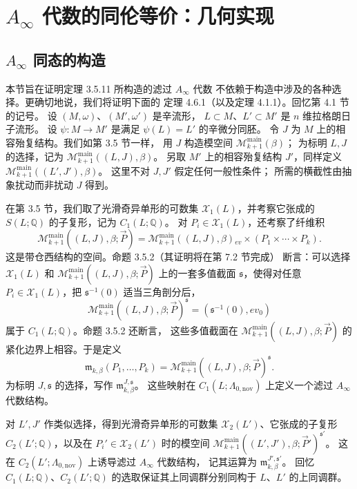 
\section{$A_\infty$ 代数的同伦等价：几何实现}
\label{sec:4-6}

\subsection{$A_\infty$ 同态的构造}
\label{subsec:4-6-1}

本节旨在证明定理 3.5.11 所构造的滤过 $A_\infty$ 代数
不依赖于构造中涉及的各种选择。更确切地说，我们将证明下面的
定理 4.6.1（以及定理 4.1.1）。回忆第 4.1 节的记号。
设 $(M,\omega)$、$(M',\omega')$ 是辛流形，
$L\subset M$、$L'\subset M'$ 是 $n$ 维拉格朗日子流形。
设 $\psi\colon M\to M'$ 是满足 $\psi(L)=L'$ 的辛微分同胚。
令 $J$ 为 $M$ 上的相容殆复结构。我们如第 3.5 节一样，
用 $J$ 构造模空间 $\mathcal M_{k+1}^{\mathrm{main}}(\beta)$；
为标明 $L,J$ 的选择，记为
$\mathcal M_{k+1}^{\mathrm{main}}((L,J),\beta)$。
另取 $M'$ 上的相容殆复结构 $J'$，同样定义
$\mathcal M_{k+1}^{\mathrm{main}}((L',J'),\beta)$。
这里不对 $J,J'$ 假定任何一般性条件；
所需的横截性由抽象扰动而非扰动 $J$ 得到。

在第 3.5 节，我们取了光滑奇异单形的可数集
$\mathcal X_1(L)$，并考察它张成的 $S(L;\mathbb Q)$
的子复形，记为 $C_1(L;\mathbb Q)$。
对 $P_i\in\mathcal X_1(L)$，还考察了纤维积
\[
 \mathcal M_{k+1}^{\mathrm{main}}((L,J),\beta;\vec P)
 =
 \mathcal M_{k+1}^{\mathrm{main}}((L,J),\beta)
 {}_{ev}\!\times(P_1\times\cdots\times P_k).
\]
这是带仓西结构的空间。命题 3.5.2（其证明将在第 7.2 节完成）
断言：可以选择 $\mathcal X_1(L)$ 和
$\mathcal M_{k+1}^{\mathrm{main}}((L,J),\beta;\vec P)$
上的一套多值截面 $\mathfrak s$，使得对任意
$P_i\in\mathcal X_1(L)$，把
$\mathfrak s^{-1}(0)$ 适当三角剖分后，
\[
 \mathcal M_{k+1}^{\mathrm{main}}
 ((L,J),\beta;\vec P)^{\mathfrak s}
 =
 (\mathfrak s^{-1}(0),ev_0)
\]
属于 $C_1(L;\mathbb Q)$。命题 3.5.2 还断言，
这些多值截面在
$\mathcal M_{k+1}^{\mathrm{main}}((L,J),\beta;\vec P)$
的紧化边界上相容。于是定义
\[
 \mathfrak m_{k,\beta}(P_1,\ldots,P_k)
 =
 \mathcal M_{k+1}^{\mathrm{main}}
 ((L,J),\beta;\vec P)^{\mathfrak s}.
\]
为标明 $J,\mathfrak s$ 的选择，写作
$\mathfrak m_{k,\beta}^{J,\mathfrak s}$。
这些映射在 $C_1(L;\Lambda_{0,\mathrm{nov}})$
上定义一个滤过 $A_\infty$ 代数结构。

对 $L',J'$ 作类似选择，得到光滑奇异单形的可数集
$\mathcal X_2(L')$、它张成的子复形
$C_2(L';\mathbb Q)$，以及在 $P_i'\in\mathcal X_2(L')$
时的模空间
$\mathcal M_{k+1}^{\mathrm{main}}
((L',J'),\beta;\vec P')^{\mathfrak s'}$。
这在 $C_2(L';\Lambda_{0,\mathrm{nov}})$
上诱导滤过 $A_\infty$ 代数结构，
记其运算为 $\mathfrak m_{k,\beta}^{J',\mathfrak s'}$。
回忆 $C_1(L;\mathbb Q)$、$C_2(L';\mathbb Q)$
的选取保证其上同调群分别同构于 $L$、$L'$ 的上同调群。

